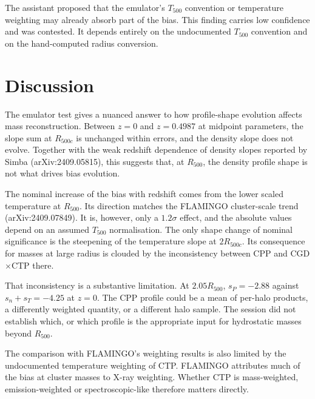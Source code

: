 \documentclass[11pt,a4paper]{article}
\begin{document}
The assistant proposed that the emulator's $T_{500}$ convention or temperature weighting may already absorb part of the bias. This finding carries low confidence and was contested. It depends entirely on the undocumented $T_{500}$ convention and on the hand-computed radius conversion.

\section{Discussion}

The emulator test gives a nuanced answer to how profile-shape evolution affects mass reconstruction. Between $z=0$ and $z=0.4987$ at midpoint parameters, the slope sum at $R_{500c}$ is unchanged within errors, and the density slope does not evolve. Together with the weak redshift dependence of density slopes reported by Simba (arXiv:2409.05815), this suggests that, at $R_{500}$, the density profile shape is not what drives bias evolution.

The nominal increase of the bias with redshift comes from the lower scaled temperature at $R_{500}$. Its direction matches the FLAMINGO cluster-scale trend (arXiv:2409.07849). It is, however, only a $1.2\sigma$ effect, and the absolute values depend on an assumed $T_{500}$ normalisation. The only shape change of nominal significance is the steepening of the temperature slope at $2R_{500c}$. Its consequence for masses at large radius is clouded by the inconsistency between CPP and CGD$\times$CTP there.

That inconsistency is a substantive limitation. At $2.05R_{500}$, $s_P=-2.88$ against $s_n+s_T=-4.25$ at $z=0$. The CPP profile could be a mean of per-halo products, a differently weighted quantity, or a different halo sample. The session did not establish which, or which profile is the appropriate input for hydrostatic masses beyond $R_{500}$.

The comparison with FLAMINGO's weighting results is also limited by the undocumented temperature weighting of CTP. FLAMINGO attributes much of the bias at cluster masses to X-ray weighting. Whether CTP is mass-weighted, emission-weighted or spectroscopic-like therefore matters directly.
\end{document}
